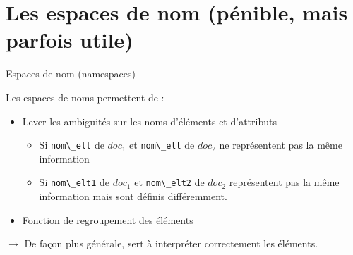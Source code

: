 

\section{Les espaces de nom (pénible, mais parfois utile)}


\begin{frame}{Espaces de nom (namespaces)}

Les espaces de noms permettent de :
\begin{itemize}
\item Lever les ambiguités sur les noms d'éléments et d'attributs
\begin{itemize}
\item Si \verb?nom\_elt? de $doc_1$ et \verb?nom\_elt? de $doc_2$ ne représentent pas la m\^eme information
\item Si \verb?nom\_elt1? de $doc_1$ et \verb?nom\_elt2? de $doc_2$ représentent pas la m\^eme information mais sont définis différemment.
\end{itemize}
\item Fonction de regroupement des éléments
\end{itemize}

$\rightarrow$ De fa\c{c}on plus générale, sert à interpréter correctement les éléments. 

\end{frame}



 
 


